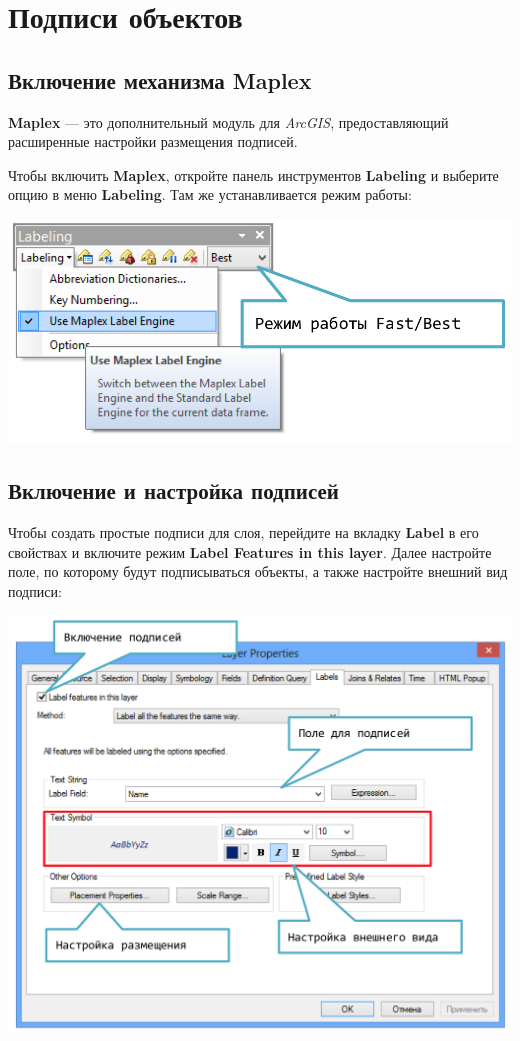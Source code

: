 \documentclass[]{book}
\theoremstyle{definition}
\theoremstyle{definition}
\theoremstyle{definition}
\theoremstyle{remark}
\begin{document}
\hypertarget{manual-labels}{%
\chapter{Подписи объектов}\label{manual-labels}}

\hypertarget{--maplex}{%
\section{Включение механизма Maplex}\label{--maplex}}

\textbf{Maplex} --- это дополнительный модуль для \emph{ArcGIS},
предоставляющий расширенные настройки размещения подписей.

Чтобы включить \textbf{Maplex}, откройте панель инструментов
\textbf{Labeling} и выберите опцию в меню \textbf{Labeling}. Там же
устанавливается режим работы:

\includegraphics{images/Appendix/image39.png}

\hypertarget{---}{%
\section{Включение и настройка подписей}\label{---}}

Чтобы создать простые подписи для слоя, перейдите на вкладку
\textbf{Label} в его свойствах и включите режим \textbf{Label Features
in this layer}. Далее настройте поле, по которому будут подписываться
объекты, а также настройте внешний вид подписи:

\includegraphics{images/Appendix/image40.png}
\end{document}

